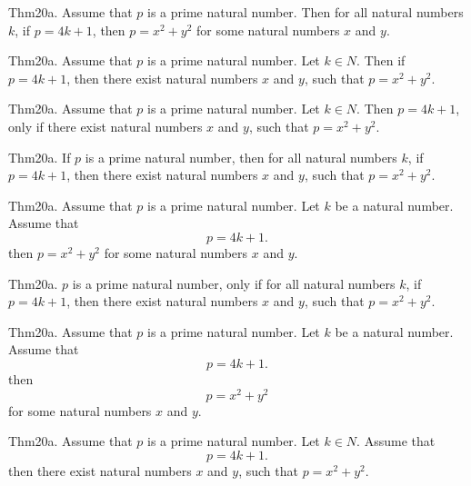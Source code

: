 \documentclass{article}
\begin{document}
Thm20a. Assume that $p$ is a prime natural number. Then for all natural numbers $k$, if $p = 4 k + 1$, then $p = x ^{ 2}+ y ^{ 2}$ for some natural numbers $x$ and $y$.

Thm20a. Assume that $p$ is a prime natural number. Let $k \in N$. Then if $p = 4 k + 1$, then there exist natural numbers $x$ and $y$, such that $p = x ^{ 2}+ y ^{ 2}$.

Thm20a. Assume that $p$ is a prime natural number. Let $k \in N$. Then $p = 4 k + 1$, only if there exist natural numbers $x$ and $y$, such that $p = x ^{ 2}+ y ^{ 2}$.

Thm20a. If $p$ is a prime natural number, then for all natural numbers $k$, if $p = 4 k + 1$, then there exist natural numbers $x$ and $y$, such that $p = x ^{ 2}+ y ^{ 2}$.

Thm20a. Assume that $p$ is a prime natural number. Let $k$ be a natural number. Assume that $$p = 4 k + 1.$$ then $p = x ^{ 2}+ y ^{ 2}$ for some natural numbers $x$ and $y$.

Thm20a. $p$ is a prime natural number, only if for all natural numbers $k$, if $p = 4 k + 1$, then there exist natural numbers $x$ and $y$, such that $p = x ^{ 2}+ y ^{ 2}$.

Thm20a. Assume that $p$ is a prime natural number. Let $k$ be a natural number. Assume that $$p = 4 k + 1.$$ then $$p = x ^{ 2}+ y ^{ 2}$$ for some natural numbers $x$ and $y$.

Thm20a. Assume that $p$ is a prime natural number. Let $k \in N$. Assume that $$p = 4 k + 1.$$ then there exist natural numbers $x$ and $y$, such that $p = x ^{ 2}+ y ^{ 2}$.
\end{document}
